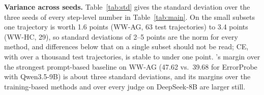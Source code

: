 \textbf{Variance across seeds.}
Table~\ref{tab:std} gives the standard deviation over the three seeds of every
step-level number in Table~\ref{tab:main}. On the small subsets one trajectory is
worth 1.6 points (\textsc{WW-AG}, 63 test trajectories) to 3.4 points (\textsc{WW-HC}, 29), so
standard deviations of 2--5 points are the norm for every method, and differences
below that on a single subset should not be read; \textsc{CE}, with over a thousand test
trajectories, is stable to under one point. \soap{}'s margin over the strongest
prompt-based baseline on \textsc{WW-AG} (47.62 vs.\ 39.68 for ErrorProbe with Qwen3.5-9B) is
about three standard deviations, and its margins over the training-based methods
and over every judge on DeepSeek-8B are larger still.


